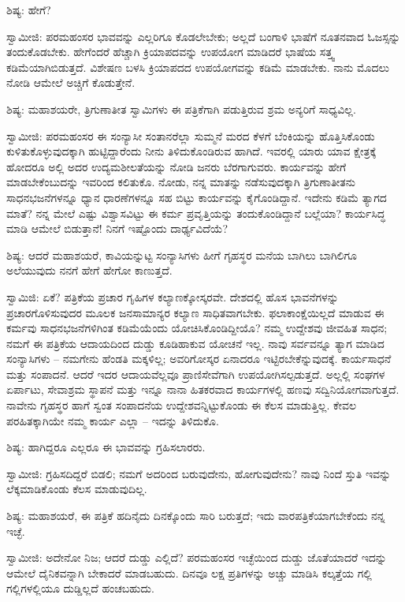 ಶಿಷ್ಯ: ಹೇಗೆ?

ಸ್ವಾಮೀಜಿ: ಪರಮಹಂಸರ ಭಾವವನ್ನು ಎಲ್ಲರಿಗೂ ಕೊಡಲೇಬೇಕು; ಅಲ್ಲದೆ ಬಂಗಾಳಿ ಭಾಷೆಗೆ ನೂತನವಾದ ಓಜಸ್ಸನ್ನು ತಂದುಕೊಡಬೇಕು. ಹೇಗೆಂದರೆ ಹೆಚ್ಚಾಗಿ ಕ್ರಿಯಾಪದವನ್ನು ಉಪಯೋಗ ಮಾಡಿದರೆ ಭಾಷೆಯ ಸತ್ತ್ವ ಕಡಿಮೆಯಾಗಿಬಿಡುತ್ತದೆ. ವಿಶೇಷಣ ಬಳಸಿ ಕ್ರಿಯಾಪದದ ಉಪಯೋಗವನ್ನು ಕಡಿಮೆ ಮಾಡಬೇಕು. ನಾನು ಮೊದಲು ನೋಡಿ ಆಮೇಲೆ ಅಚ್ಚಿಗೆ ಕೊಡುತ್ತೇನೆ.

ಶಿಷ್ಯ: ಮಹಾಶಯರೇ, ತ್ರಿಗುಣಾತೀತ ಸ್ವಾಮಿಗಳು ಈ ಪತ್ರಿಕೆಗಾಗಿ ಪಡುತ್ತಿರುವ ಶ್ರಮ ಅನ್ಯರಿಗೆ ಸಾಧ್ಯವಿಲ್ಲ.

ಸ್ವಾಮೀಜಿ: ಪರಮಹಂಸರ ಈ ಸಂನ್ಯಾಸೀ ಸಂತಾನರೆಲ್ಲಾ ಸುಮ್ಮನೆ ಮರದ ಕೆಳಗೆ ಬೆಂಕಿಯನ್ನು ಹೊತ್ತಿಸಿಕೊಂಡು ಕುಳಿತುಕೊಳ್ಳುವುದಕ್ಕಾಗಿ ಹುಟ್ಟಿದ್ದಾರೆಂದು ನೀನು ತಿಳಿದುಕೊಂಡಿರುವ ಹಾಗಿದೆ. ಇವರಲ್ಲಿ ಯಾರು ಯಾವ ಕ್ಷೇತ್ರಕ್ಕೆ ಹೋದರೂ ಅಲ್ಲಿ ಅದರ ಉದ್ಯಮಶೀಲತೆಯನ್ನು ನೋಡಿ ಜನರು ಬೆರಗಾಗುವರು. ಕಾರ್ಯವನ್ನು ಹೇಗೆ ಮಾಡಬೇಕೆಂಬುದನ್ನು ಇವರಿಂದ ಕಲಿತುಕೊ. ನೋಡು, ನನ್ನ ಮಾತನ್ನು ನಡೆಸುವುದಕ್ಕಾಗಿ ತ್ರಿಗುಣಾತೀತನು ಸಾಧನಭಜನೆಗಳನ್ನೂ ಧ್ಯಾನ ಧಾರಣೆಗಳನ್ನೂ ಸಹ ಬಿಟ್ಟು ಕಾರ್ಯವನ್ನು ಕೈಗೊಂಡಿದ್ದಾನೆ. ಇದೇನು ಕಡಿಮೆ ತ್ಯಾಗದ ಮಾತೆ? ನನ್ನ ಮೇಲೆ ಎಷ್ಟು ವಿಶ್ವಾಸವಿಟ್ಟು ಈ ಕರ್ಮ ಪ್ರವೃತ್ತಿಯನ್ನು ತಂದುಕೊಂಡಿದ್ದಾನೆ ಬಲ್ಲೆಯಾ? ಕಾರ್ಯಸಿದ್ಧ ಮಾಡಿ ಆಮೇಲೆ ಬಿಡುತ್ತಾನೆ! ನಿನಗೆ ಇಷ್ಟೊಂದು ದಾರ್ಢ್ಯವಿದೆಯೆ?

ಶಿಷ್ಯ: ಆದರೆ ಮಹಾಶಯರೆ, ಕಾವಿಯನ್ನುಟ್ಟ ಸಂನ್ಯಾಸಿಗಳು ಹೀಗೆ ಗೃಹಸ್ಥರ ಮನೆಯ ಬಾಗಿಲು ಬಾಗಿಲಿಗೂ ಅಲೆಯುವುದು ನನಗೆ ಹೇಗೆ ಹೇಗೋ ಕಾಣುತ್ತದೆ.

ಸ್ವಾಮಿಜಿ: ಏಕೆ? ಪತ್ರಿಕೆಯ ಪ್ರಚಾರ ಗೃಹಿಗಳ ಕಲ್ಯಾಣಕ್ಕೋಸ್ಕರವೇ. ದೇಶದಲ್ಲಿ ಹೊಸ ಭಾವನೆಗಳನ್ನು ಪ್ರಚಾರಗೊಳಿಸುವುದರ ಮೂಲಕ ಜನಸಾಮಾನ್ಯರ ಕಲ್ಯಾಣ ಸಾಧಿತವಾಗಬೇಕು. ಫಲಾಕಾಂಕ್ಷೆಯಿಲ್ಲದೆ ಮಾಡುವ ಈ ಕರ್ಮವು ಸಾಧನಭಜನೆಗಳಿಗಿಂತ ಕಡಿಮೆಯೆಂದು ಯೋಚಿಸಿಕೊಂಡಿದ್ದೀಯೊ? ನಮ್ಮ ಉದ್ದೇಶವು ಜೀವಹಿತ ಸಾಧನ; ನಮಗೆ ಈ ಪತ್ರಿಕೆಯ ಆದಾಯದಿಂದ ದುಡ್ಡು ಕೂಡಿಹಾಕುವ ಯೋಚನೆ ಇಲ್ಲ. ನಾವು ಸರ್ವವನ್ನೂ ತ್ಯಾಗ ಮಾಡಿದ ಸಂನ್ಯಾಸಿಗಳು – ನಮಗೇನು ಹೆಂಡತಿ ಮಕ್ಕಳಿಲ್ಲ; ಅವರಿಗೋಸ್ಕರ ಏನಾದರೂ ಇಟ್ಟಿರಬೇಕೆನ್ನುವುದಕ್ಕೆ. ಕಾರ್ಯಸಾಧನೆ ಮತ್ತು ಸಂಪಾದನೆ. ಆದರೆ ಇದರ ಆದಾಯವೆಲ್ಲವೂ ಪ್ರಾಣಿಸೇವೆಗಾಗಿ ಉಪಯೋಗಿಸಲ್ಪಡುತ್ತದೆ. ಅಲ್ಲಲ್ಲಿ ಸಂಘಗಳ ಏರ್ಪಾಟು, ಸೇವಾಶ್ರಮ ಸ್ಥಾಪನೆ ಮತ್ತು ಇನ್ನೂ ನಾನಾ ಹಿತಕರವಾದ ಕಾರ್ಯಗಳಲ್ಲಿ ಹಣವು ಸದ್ವಿನಿಯೋಗವಾಗುತ್ತದೆ. ನಾವೇನು ಗೃಹಸ್ಥರ ಹಾಗೆ ಸ್ವಂತ ಸಂಪಾದನೆಯ ಉದ್ದೇಶವನ್ನಿಟ್ಟುಕೊಂಡು ಈ ಕೆಲಸ ಮಾಡುತ್ತಿಲ್ಲ. ಕೇವಲ ಪರಹಿತಕ್ಕಾಗಿಯೇ ನಮ್ಮ ಕಾರ್ಯ ಎಲ್ಲಾ – ಇದನ್ನು ತಿಳಿದುಕೊ.

ಶಿಷ್ಯ: ಹಾಗಿದ್ದರೂ ಎಲ್ಲರೂ ಈ ಭಾವವನ್ನು ಗ್ರಹಿಸಲಾರರು.

ಸ್ವಾಮೀಜಿ: ಗ್ರಹಿಸದಿದ್ದರೆ ಬಿಡಲಿ; ನಮಗೆ ಅದರಿಂದ ಬರುವುದೇನು, ಹೋಗುವುದೇನು? ನಾವು ನಿಂದೆ ಸ್ತುತಿ ಇವನ್ನು ಲೆಕ್ಕಮಾಡಿಕೊಂಡು ಕೆಲಸ ಮಾಡುವುದಿಲ್ಲ.

ಶಿಷ್ಯ: ಮಹಾಶಯರೆ, ಈ ಪತ್ರಿಕೆ ಹದಿನೈದು ದಿನಕ್ಕೊಂದು ಸಾರಿ ಬರುತ್ತದೆ; ಇದು ವಾರಪತ್ರಿಕೆಯಾಗಬೇಕೆಂದು ನನ್ನ ಇಚ್ಛೆ.

ಸ್ವಾಮೀಜಿ: ಅದೇನೋ ನಿಜ; ಆದರೆ ದುಡ್ಡು ಎಲ್ಲಿದೆ? ಪರಮಹಂಸರ ಇಚ್ಛೆಯಿಂದ ದುಡ್ಡು ಜೊತೆಯಾದರೆ ಇದನ್ನು ಆಮೇಲೆ ದೈನಿಕವನ್ನಾಗಿ ಬೇಕಾದರೆ ಮಾಡಬಹುದು. ದಿನವೂ ಲಕ್ಷ ಪ್ರತಿಗಳನ್ನು ಅಚ್ಚು ಮಾಡಿಸಿ ಕಲ್ಕತ್ತೆಯ ಗಲ್ಲಿ ಗಲ್ಲಿಗಳಲ್ಲಿಯೂ ದುಡ್ಡಿಲ್ಲದೆ ಹಂಚಬಹುದು.

